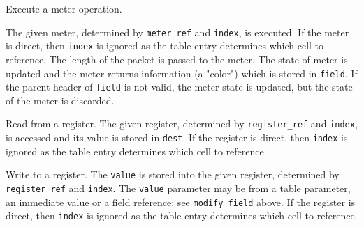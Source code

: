 \documentclass[12pt]{article}
\begin{document}

{ %
Execute a meter operation.
}
{ %
}
{ %
The given meter, determined by \texttt{meter_ref} and \texttt{index}, is executed. If the 
meter is direct, then \texttt{index} is ignored as the table entry determines which 
cell to reference. The length of the packet is passed to the meter. The state 
of meter is updated and the meter returns information (a "color") which is 
stored in \texttt{field}. If the parent header of \texttt{field} is not valid, the meter 
state is updated, but the state of the meter is discarded.

}


{ %
Read from a register.
}
{ %
}
{ %
The given register, determined by \texttt{register_ref} and \texttt{index}, is accessed and its value is stored in \texttt{dest}. If the register is direct, then \texttt{index} is ignored as the table entry determines which 
cell to reference.
}


{ %
Write to a register.
}
{ %
}
{ %
The \texttt{value} is stored into the given register, determined by \texttt{register_ref} and \texttt{index}.
The \texttt{value} parameter 
may be from a table parameter, an immediate value or a field reference; see \texttt{modify_field} above. 
If the register is direct, then \texttt{index} is ignored as the table entry determines which 
cell to reference. 
}
\end{document}
